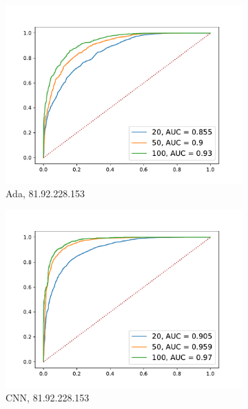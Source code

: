 \documentclass[12pt,a4paper,automark, toc=bib]{scrreprt}
\theoremstyle{definition}
\begin{document}
\begin{figure}
\begin{subfigure}{0.32\linewidth}
					\includegraphics[width=\linewidth]{figures/md5_81.92.228.153_AdaBoost.pdf}
					\caption{Ada, 81.92.228.153}
				\end{subfigure}
				\begin{subfigure}{0.32\linewidth}
					\centering
					\includegraphics[width=\linewidth]{figures/md5_81.92.228.153_keras.pdf}
					\caption{CNN, 81.92.228.153}
				\end{subfigure}
				\begin{subfigure}{0.32\linewidth}
					\centering

\end{subfigure}
\end{figure}
\end{document}
